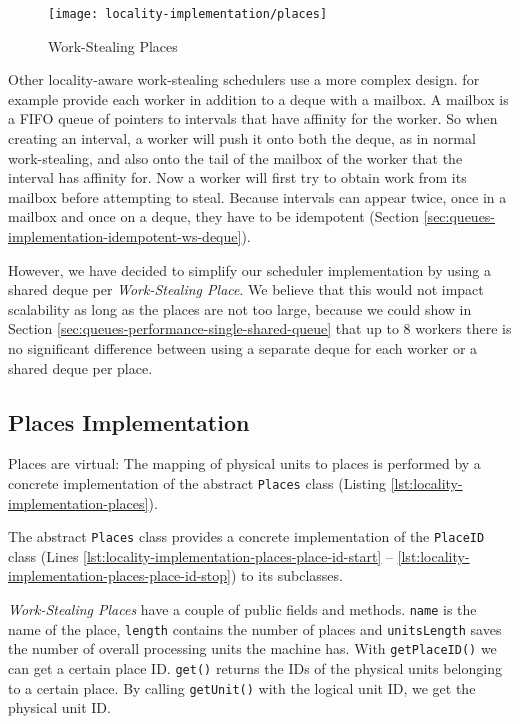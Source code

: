\begin{figure}[!ht]
  \centering
  \texttt{[image: locality-implementation/places]}
  \caption{Work-Stealing Places}
  \label{fig:locality-implementation-work-stealing-places}
\end{figure}

Other locality-aware work-stealing schedulers use a more complex
design. \textcite{Acar2002} for example provide each worker in
addition to a deque with a mailbox. A mailbox is a FIFO queue of
pointers to intervals that have affinity for the worker. So when
creating an interval, a worker will push it onto both the deque, as in
normal work-stealing, and also onto the tail of the mailbox of the
worker that the interval has affinity for. Now a worker will first try
to obtain work from its mailbox before attempting to steal. Because
intervals can appear twice, once in a mailbox and once on a deque,
they have to be idempotent (Section
\ref{sec:queues-implementation-idempotent-ws-deque}).

However, we have decided to simplify our scheduler implementation by
using a shared deque per \emph{Work-Stealing Place}. We believe that
this would not impact scalability as long as the places are not too
large, because we could show in Section
\ref{sec:queues-performance-single-shared-queue} that up to 8 workers
there is no significant difference between using a separate deque for
each worker or a shared deque per place.

\subsection{Places Implementation}
\label{sec:locality-implementation-work-stealing-places-implementation}

Places are virtual: The mapping of physical units to places is
performed by a concrete implementation of the abstract
\lstinline!Places! class (Listing
\ref{lst:locality-implementation-places}).



The abstract \lstinline!Places! class provides a concrete
implementation of the \lstinline!PlaceID! class (Lines
\ref{lst:locality-implementation-places-place-id-start} --
\ref{lst:locality-implementation-places-place-id-stop}) to its
subclasses. 

\emph{Work-Stealing Places} have a couple of public fields and
methods. \lstinline!name! is the name of the place, \lstinline!length!
contains the number of places and \lstinline!unitsLength! saves the
number of overall processing units the machine has. With
\lstinline!getPlaceID()!  we can get a certain place
ID. \lstinline!get()! returns the IDs of the physical units belonging
to a certain place. By calling \lstinline!getUnit()! with the logical
unit ID, we get the physical unit ID.


